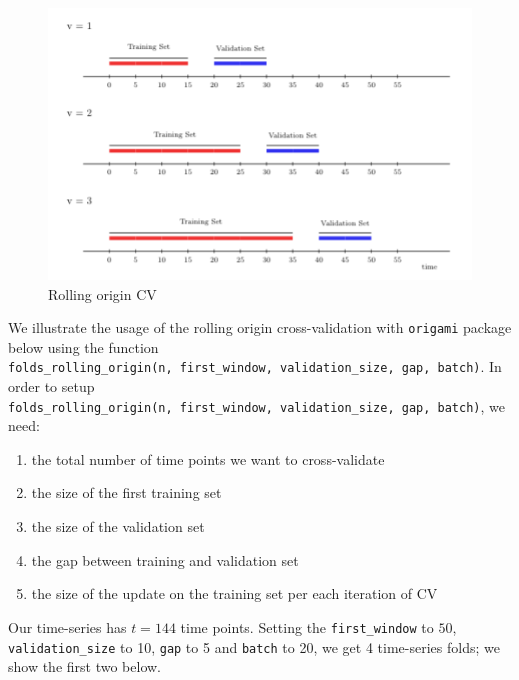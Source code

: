 \documentclass[12pt, krantz2,]{krantz}
\providecommand{\tightlist}{%
  \setlength{\itemsep}{0pt}\setlength{\parskip}{0pt}}
\theoremstyle{definition}
\theoremstyle{definition}
\theoremstyle{definition}
\newcommand{\1}{\mathbbm{1}}
\begin{document}
\begin{figure}

{\centering \includegraphics[width=0.8\linewidth]{img/image/rolling_origin} 

}

\caption{Rolling origin CV}\label{fig:unnamed-chunk-1}
\end{figure}

We illustrate the usage of the rolling origin cross-validation with \texttt{origami}
package below using the function \texttt{folds\_rolling\_origin(n,\ first\_window,\ validation\_size,\ gap,\ batch)}. In order to setup \texttt{folds\_rolling\_origin(n,\ first\_window,\ validation\_size,\ gap,\ batch)}, we need:

\begin{enumerate}
\def\labelenumi{\arabic{enumi}.}
\tightlist
\item
  the total number of time points we want to cross-validate
\item
  the size of the first training set
\item
  the size of the validation set
\item
  the gap between training and validation set
\item
  the size of the update on the training set per each iteration of CV
\end{enumerate}

Our time-series has \(t=144\) time points. Setting the \texttt{first\_window} to \(50\),
\texttt{validation\_size} to 10, \texttt{gap} to 5 and \texttt{batch} to 20, we get 4 time-series
folds; we show the first two below.
\end{document}
